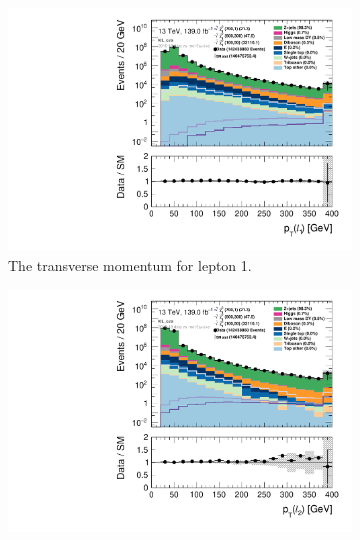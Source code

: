 \begin{figure}[H]
\centering
    \begin{subfigure}[t!]{0.49\textwidth}
        \includegraphics[width=\textwidth]{Figures/SlepSlep/CutAndCount/ML_cuts/hist1d_lepPt[0]_ML_cuts.pdf}
    \caption{The transverse momentum for lepton 1.}
    \label{fig:my_label}
    \end{subfigure}
    \begin{subfigure}[t!]{0.49\textwidth}
        \includegraphics[width=\textwidth]{Figures/SlepSlep/CutAndCount/ML_cuts/hist1d_lepPt[1]_ML_cuts.pdf}

\end{subfigure}
\end{figure}
